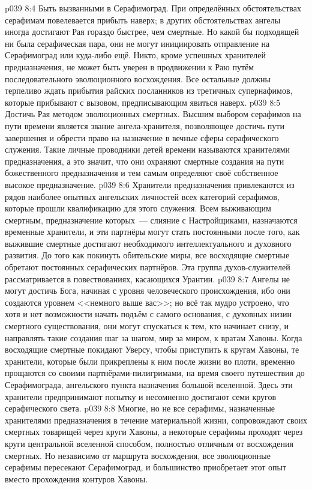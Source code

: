 \vs p039 8:4 Быть вызванными в Серафимоград. При определённых обстоятельствах серафимам повелевается прибыть наверх; в других обстоятельствах ангелы иногда достигают Рая гораздо быстрее, чем смертные. Но какой бы подходящей ни была серафическая пара, они не могут инициировать отправление на Серафимоград или куда\hyp{}либо ещё. Никто, кроме успешных хранителей предназначения, не может быть уверен в продвижении к Раю путём последовательного эволюционного восхождения. Все остальные должны терпеливо ждать прибытия райских посланников из третичных супернафимов, которые прибывают с вызовом, предписывающим явиться наверх.
\vs p039 8:5 Достичь Рая методом эволюционных смертных. Высшим выбором серафимов на пути времени является звание ангела\hyp{}хранителя, позволяющее достичь пути завершения и обрести право на назначение в вечные сферы серафического служения. Такие личные проводники детей времени называются хранителями предназначения, а это значит, что они охраняют смертные создания на пути божественного предназначения и тем самым определяют своё собственное высокое предназначение.
\vs p039 8:6 Хранители предназначения привлекаются из рядов наиболее опытных ангельских личностей всех категорий серафимов, которые прошли квалификацию для этого служения. Всем выживающим смертным, предназначение которых~--- слияние с Настройщиками, назначаются временные хранители, и эти партнёры могут стать постоянными после того, как выжившие смертные достигают необходимого интеллектуального и духовного развития. До того как покинуть обительские миры, все восходящие смертные обретают постоянных серафических партнёров. Эта группа духов\hyp{}служителей рассматривается в повествованиях, касающихся Урантии.
\vs p039 8:7 \pc Ангелы не могут достичь Бога, начиная с уровня человеческого происхождения, ибо они создаются уровнем <<немного выше вас>>; но всё так мудро устроено, что хотя и нет возможности начать подъём с самого основания, с духовных низин смертного существования, они могут спускаться к тем, кто начинает снизу, и направлять такие создания шаг за шагом, мир за миром, к вратам Хавоны. Когда восходящие смертные покидают Уверсу, чтобы приступить к кругам Хавоны, те хранители, которые были прикреплены к ним после жизни во плоти, временно прощаются со своими партнёрами\hyp{}пилигримами, на время своего путешествия до Серафимограда, ангельского пункта назначения большой вселенной. Здесь эти хранители предпринимают попытку и несомненно достигают семи кругов серафического света.
\vs p039 8:8 Многие, но не все серафимы, назначенные хранителями предназначения в течение материальной жизни, сопровождают своих смертных товарищей через круги Хавоны, а некоторые серафимы проходят через круги центральной вселенной способом, полностью отличным от восхождения смертных. Но независимо от маршрута восхождения, все эволюционные серафимы пересекают Серафимоград, и большинство приобретает этот опыт вместо прохождения контуров Хавоны.
